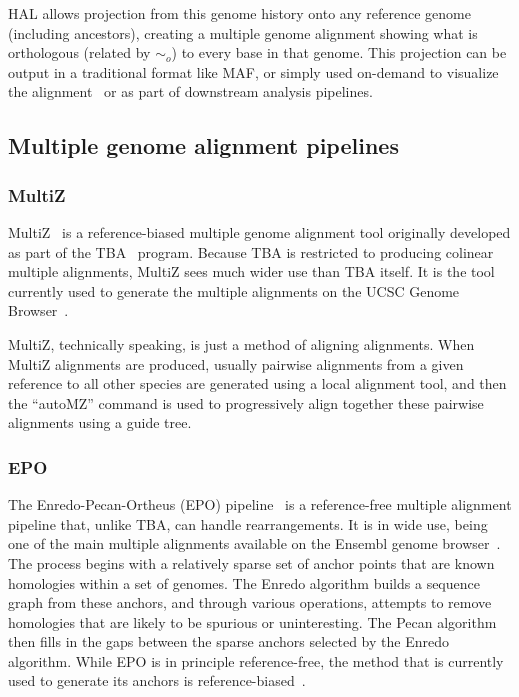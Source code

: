 \documentclass[fleqn,10pt]{wlscirep}
\begin{document}
HAL allows projection from this genome history onto any reference genome (including ancestors), creating a multiple genome alignment showing what is orthologous (related by $\sim_o$) to every base in that genome. This projection can be output in a traditional format like MAF, or simply used on-demand to visualize the alignment~\cite{assemblyHub} or as part of downstream analysis pipelines.
\subsection{Multiple genome alignment pipelines}
\subsubsection{MultiZ}
MultiZ~\cite{tba} is a reference-biased multiple genome alignment tool originally developed as part of the TBA~\cite{tba} program.
Because TBA is restricted to producing colinear multiple alignments, MultiZ sees much wider use than TBA itself.
It is the tool currently used to generate the multiple alignments on the UCSC Genome Browser~\cite{ucscbrowser}.

MultiZ, technically speaking, is just a method of aligning alignments.
When MultiZ alignments are produced, usually pairwise alignments from a given reference to all other species are generated using a local alignment tool, and then the ``autoMZ'' command is used to progressively align together these pairwise alignments using a guide tree.
\subsubsection{EPO}
The Enredo-Pecan-Ortheus (EPO) pipeline~\cite{epo, ortheus} is a reference-free multiple alignment pipeline that, unlike TBA, can handle rearrangements.
It is in wide use, being one of the main multiple alignments available on the Ensembl genome browser~\cite{Aken01012016}.
The process begins with a relatively sparse set of anchor points that are known homologies within a set of genomes.
The Enredo algorithm builds a sequence graph from these anchors, and through various operations, attempts to remove homologies that are likely to be spurious or uninteresting.
The Pecan algorithm then fills in the gaps between the sparse anchors selected by the Enredo algorithm.
While EPO is in principle reference-free, the method that is currently used to generate its anchors is reference-biased~\cite{epo}.
\end{document}
